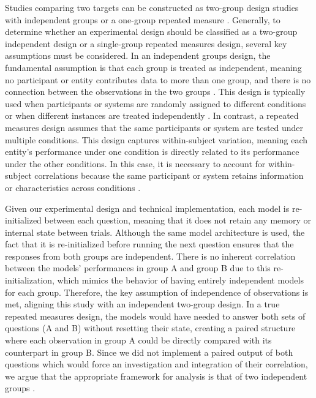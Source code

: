 \par Studies comparing two targets can be constructed as two-group design studies with independent groups or a one-group repeated measure \parencite{dunlap1996meta,goulet2018review}. Generally, to determine whether an experimental design should be classified as a two-group independent design or a single-group repeated measures design, several key assumptions must be considered. In an independent groups design, the fundamental assumption is that each group is treated as independent, meaning no participant or entity contributes data to more than one group, and there is no connection between the observations in the two groups \parencite{morris2002combining}. This design is typically used when participants or systems are randomly assigned to different conditions or when different instances are treated independently \parencite{cohen1988statistical,morris2002combining}. In contrast, a repeated measures design assumes that the same participants or system are tested under multiple conditions. This design captures within-subject variation, meaning each entity's performance under one condition is directly related to its performance under the other conditions. In this case, it is necessary to account for within-subject correlations because the same participant or system retains information or characteristics across conditions \parencite{dunlap1996meta,morris2002combining}.

\par Given our experimental design and technical implementation, each model is re-initialized between each question, meaning that it does not retain any memory or internal state between trials. Although the same model architecture is used, the fact that it is re-initialized before running the next question ensures that the responses from both groups are independent. There is no inherent correlation between the models' performances in group A and group B due to this re-initialization, which mimics the behavior of having entirely independent models for each group. Therefore, the key assumption of independence of observations is met, aligning this study with an independent two-group design. In a true repeated measures design, the models would have needed to answer both sets of questions (A and B) without resetting their state, creating a paired structure where each observation in group A could be directly compared with its counterpart in group B. Since we did not implement a paired output of both questions which would force an investigation and integration of their correlation, we argue that the appropriate framework for analysis is that of two independent groups \parencite{dunlap1996meta}.


